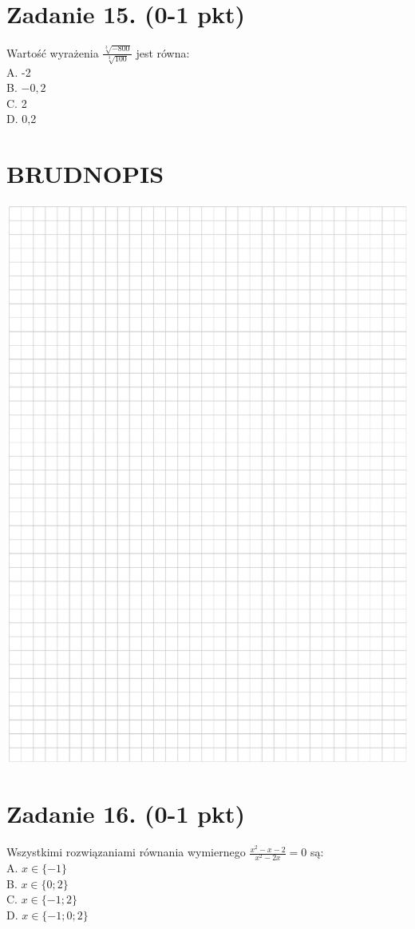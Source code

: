 \documentclass[10pt]{article}
\begin{document}
\section*{Zadanie 15. (0-1 pkt)}
Wartość wyrażenia \(\frac{\sqrt[3]{-800}}{\sqrt[3]{100}}\) jest równa:\\
A. -2\\
B. \(-0,2\)\\
C. 2\\
D. 0,2

\section*{BRUDNOPIS}
\begin{center}
\includegraphics[max width=\textwidth]{2024_11_21_b8ac5f500a5bbb1b4ec5g-07}
\end{center}

\section*{Zadanie 16. (0-1 pkt)}
Wszystkimi rozwiązaniami równania wymiernego \(\frac{x^{2}-x-2}{x^{2}-2 x}=0\) są:\\
A. \(x \in\{-1\}\)\\
B. \(x \in\{0 ; 2\}\)\\
C. \(x \in\{-1 ; 2\}\)\\
D. \(x \in\{-1 ; 0 ; 2\}\)
\end{document}
